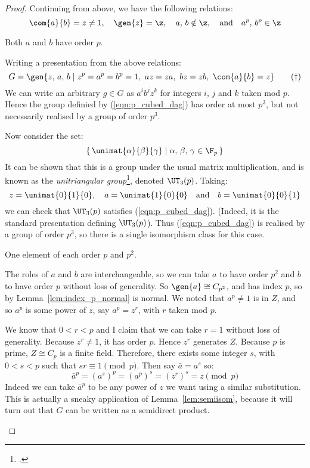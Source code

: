 \begin{proof}
Continuing from above, we have the following relations:
\[ \com{a}{b} = z \neq 1, \quad \gen{z} = \z, \quad a,\,b \notin \z, \quad \text{and} \quad a^p,\,b^p \in \z \]

\begin{case}
    \item Both \(a\) and \(b\) have order \(p\).

        Writing a presentation from the above relations:
        \[G = \gen{z,\,a,\,b \mid z^p = a^p = b^p = 1,\ az = za,\ bz = zb,\ \com{a}{b} = z} \tag{\dag}\label{eqn:p_cubed_dag}\]
        We can write an arbitrary \(g \in G\) as \(a^i b^j z^k\) for integers \(i\), \(j\) and \(k\) taken mod \(p\).
        Hence the group definied by (\ref{eqn:p_cubed_dag}) has order at most \(p^3\), but not necessarily realised by a group of order \(p^3\).

        Now consider the set:
        \[\left\{\,\unimat{\alpha}{\beta}{\gamma} \mid \alpha,\,\beta,\,\gamma \in \F_p\,\right\}\]
        It can be shown that this is a group under the usual matrix multiplication, and is known as the
        \emph{unitriangular group}\footcite{unitriangular}, denoted \(\UT_3(p)\).
        Taking:
        \[z = \unimat{0}{1}{0}, \quad a = \unimat{1}{0}{0} \quad \text{and} \quad b = \unimat{0}{0}{1}\]
        we can check that \(\UT_3(p)\) satisfies (\ref{eqn:p_cubed_dag}).
        (Indeed, it is the standard presentation defining \(\UT_3(p)\)).
        Thus (\ref{eqn:p_cubed_dag}) is realised by a group of order \(p^3\), so there is a single isomorphism class for this case.

    \item One element of each order \(p\) and \(p^2\).

        The roles of \(a\) and \(b\) are interchangeable, so we can take \(a\) to have order \(p^2\) and \(b\) to have
        order \(p\) without loss of generality.
        So \(\gen{a} \cong C_{p^2}\), and has index \(p\), so by Lemma~\ref{lem:index_p_normal} is normal.
        We noted that \(a^p \neq 1\) is in \(Z\), and so \(a^p\) is some power of \(z\), say \(a^p = z^r\), with \(r\)
        taken mod \(p\).

        We know that \(0 < r < p\) and I claim that we can take \(r = 1\) without loss of generality.
        Because \(z^r \neq 1\), it has order \(p\).
        Hence \(z^r\) generates \(Z\).
        Because \(p\) is prime, \(Z \cong C_p\) is a finite field.
        Therefore, there exists some integer \(s\), with \(0 < s < p\) such that \(sr \equiv 1 \pmod{p}\).
        Then say \(\bar{a} = a^s\) so:
        \[\bar{a}^p = {(a^s)}^p = {(a^p)}^s = {(z^r)}^s = z \pmod{p}\]
        Indeed we can take \(\bar{a}^p\) to be any power of \(z\) we want using a similar substitution.
        This is actually a sneaky application of Lemma~\ref{lem:semiisom}, because it will turn out that \(G\) can be
        written as a semidirect product.


\end{case}
\end{proof}
